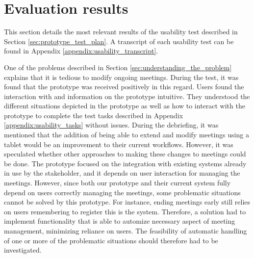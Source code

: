 \section{Evaluation results}\label{sec:usability_evaluation_results}
This section details the most relevant results of the usability test described in Section \ref{sec:prototype_test_plan}.
A transcript of each usability test can be found in Appendix \ref{appendix:usability_transcript}.

One of the problems described in Section \ref{sec:understanding_the_problem} explains that it is tedious to modify ongoing meetings. 
During the test, it was found that the prototype was received positively in this regard. 
Users found the interaction with and information on the prototype intuitive. 
They understood the different situations depicted in the prototype as well as how to interact with the prototype to complete the test tasks described in Appendix \ref{appendix:usability_tasks} without issues.
During the debriefing, it was mentioned that the addition of being able to extend and modify meetings using a tablet would be an improvement to their current workflows.
However, it was speculated whether other approaches to making these changes to meetings could be done. 
The prototype focused on the integration with existing systems already in use by the stakeholder, and it depends on user interaction for managing the meetings.
However, since both our prototype and their current system fully depend on users correctly managing the meetings, some problematic situations cannot be solved by this prototype. 
For instance, ending meetings early still relies on users remembering to register this is the system. 
Therefore, a solution had to implement functionality that is able to automize necessary aspect of meeting management, minimizing reliance on users.
The feasibility of  automatic handling of one or more of the problematic situations should therefore had to be investigated.